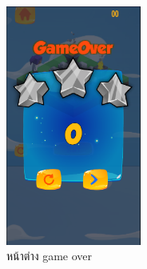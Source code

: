 \begin{figure}[h!]
\begin{center}
\includegraphics[width=1.75in]{pic/GameOver1.png}
\end{center}
\caption{หน้าต่าง game over}
\label{lose}
\end{figure}

\clearpage

